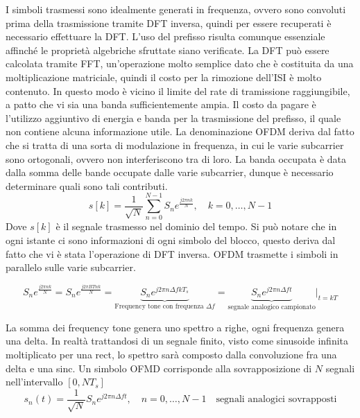 


I simboli trasmessi sono idealmente generati in frequenza, ovvero sono convoluti prima della trasmissione tramite DFT inversa, quindi per essere recuperati è necessario effettuare la DFT. L'uso del prefisso risulta comunque essenziale affinché le proprietà algebriche sfruttate siano verificate. 
La DFT può essere calcolata tramite FFT, un'operazione molto semplice dato che è costituita da una moltiplicazione matriciale, quindi il costo per la rimozione dell'ISI è molto contenuto. In questo modo è vicino il limite del rate di tramissione raggiungibile, a patto che vi sia una banda sufficientemente ampia.
Il costo da pagare è l'utilizzo aggiuntivo di energia e banda per la trasmissione del prefisso, il quale non contiene alcuna informazione utile.
La denominazione OFDM deriva dal fatto che si tratta di una sorta di modulazione in frequenza, in cui le varie subcarrier sono ortogonali, ovvero non interferiscono tra di loro. 
La banda occupata è data dalla somma delle bande occupate dalle varie subcarrier, dunque è necessario determinare quali sono tali contributi.
\[
    s[k] = \frac{1}{\sqrt{N}} \sum_{n=0}^{N-1} S_n e^{\frac{j2\pi nk}{N}}, \quad k = 0, \ldots, N-1
\]
Dove $s[k]$ è il segnale trasmesso nel dominio del tempo. Si può notare che in ogni istante ci sono informazioni di ogni simbolo del blocco, questo deriva dal fatto che vi è stata l'operazione di DFT inversa. OFDM trasmette i simboli in parallelo sulle varie subcarrier. 

\[
    S_n e^{\frac{j2\pi nk}{N}} = S_n e^{\frac{j2\pi BTnk}{N}} = \underbrace{S_n e^{j2\pi n\Delta f k T_s}}_{\text{Frequency tone con frequenza $\Delta f$}} = \underbrace{S_n e^{j 2 \pi n \Delta f t}}_{\text{segnale analogico campionato}} \bigg|_{t=kT}
\]




La somma dei frequency tone genera uno spettro a righe, ogni frequenza genera una delta. In realtà trattandosi di un segnale finito, visto come sinusoide infinita moltiplicato per una rect, lo spettro sarà composto dalla convoluzione fra una delta e una sinc.
Un simbolo OFMD corrisponde alla sovrapposizione di $N$ segnali nell'intervallo $[0, NT_s]$
\[
    s_n(t) = \frac{1}{\sqrt{N}} S_n e^{j2\pi n \Delta f t}, \quad n = 0, \ldots, N-1 \quad \text{segnali analogici sovrapposti}
\]

